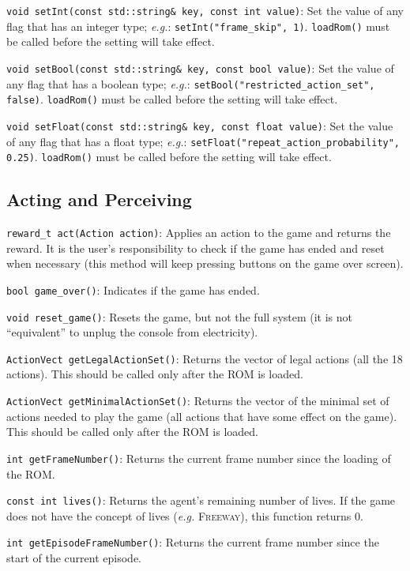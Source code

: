 \documentclass[12pt]{article}
\begin{document}
  \verb+void setInt(const std::string& key, const int value)+: Set the value of any flag
  that has an integer type; \emph{e.g.}: \verb+setInt("frame_skip", 1)+. \verb+loadRom()+
  must be called before the setting will take effect.
  
  \verb+void setBool(const std::string& key, const bool value)+: Set the value of any flag
  that has a boolean type; \emph{e.g.}: \verb+setBool("restricted_action_set", false)+.
  \verb+loadRom()+ must be called before the setting will take effect.
  
  \verb+void setFloat(const std::string& key, const float value)+: Set the value of any flag
  that has a float type; \emph{e.g.}: \verb+setFloat("repeat_action_probability", 0.25)+.
  \verb+loadRom()+ must be called before the setting will take effect.
  
  \subsection{Acting and Perceiving}
  
  \indent \indent \verb+reward_t act(Action action)+: Applies an action to the game and returns the
  reward. It is the user's responsibility to check if the game has ended and reset when necessary
  (this method will keep pressing buttons on the game over screen).
  
  \verb+bool game_over()+: Indicates if the game has ended.
  
  \verb+void reset_game()+: Resets the game, but not the full system (it is not ``equivalent''
  to  unplug the console from electricity).
  
  \verb+ActionVect getLegalActionSet()+: Returns the vector of legal actions (all the 18 actions).
  This should be called only after the ROM is loaded.
  
  \verb+ActionVect getMinimalActionSet()+: Returns the vector of the minimal set of actions
  needed to play the game (all actions that have some effect on the game). This should be
  called only after the ROM is loaded.
  
  \verb+int getFrameNumber()+: Returns the current frame number since the loading of the ROM.
  
  \verb+const int lives()+: Returns the agent's remaining number of lives. If the game does not have 
  the concept of lives (\emph{e.g.} \textsc{Freeway}), this function returns 0.
  
  \verb+int getEpisodeFrameNumber()+: Returns the current frame number since the start of the
  current episode.
  
\end{document}
